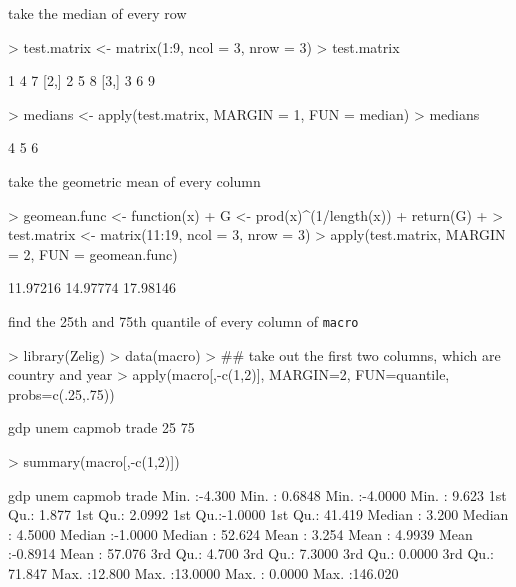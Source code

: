 \documentclass[handout]{beamer}
\newcommand{\red}{\color{red}}
\begin{document}
\begin{frame}[fragile]
take the median of every row
\bigskip
\red
\footnotesize
\begin{Schunk}
\begin{Sinput}
> test.matrix <- matrix(1:9, ncol = 3, nrow = 3)
> test.matrix
\end{Sinput}
\begin{Soutput}
     [,1] [,2] [,3]
[1,]    1    4    7
[2,]    2    5    8
[3,]    3    6    9
\end{Soutput}
\begin{Sinput}
> medians <- apply(test.matrix, MARGIN = 1, FUN = median)
> medians
\end{Sinput}
\begin{Soutput}
[1] 4 5 6
\end{Soutput}
\end{Schunk}
\end{frame}

\begin{frame}[fragile]
take the geometric mean of every column
\bigskip
\red
\footnotesize
\begin{Schunk}
\begin{Sinput}
> geomean.func <- function(x) {
+     G <- prod(x)^(1/length(x))
+     return(G)
+ }
> test.matrix <- matrix(11:19, ncol = 3, nrow = 3)
> apply(test.matrix, MARGIN = 2, FUN = geomean.func)
\end{Sinput}
\begin{Soutput}
[1] 11.97216 14.97774 17.98146
\end{Soutput}
\end{Schunk}
\end{frame}

\begin{frame}[fragile]
find the 25th and 75th quantile of every column of {\tt macro}
\bigskip
\red
\footnotesize
\begin{Schunk}
\begin{Sinput}
> library(Zelig)
> data(macro)
> ## take out the first two columns, which are country and year
> apply(macro[,-c(1,2)], MARGIN=2, FUN=quantile, probs=c(.25,.75))
\end{Sinput}
\begin{Soutput}
         gdp     unem capmob    trade
25%
75%
\end{Soutput}
\begin{Sinput}
> summary(macro[,-c(1,2)])
\end{Sinput}
\begin{Soutput}
      gdp              unem             capmob            trade        
 Min.   :-4.300   Min.   : 0.6848   Min.   :-4.0000   Min.   :  9.623  
 1st Qu.: 1.877   1st Qu.: 2.0992   1st Qu.:-1.0000   1st Qu.: 41.419  
 Median : 3.200   Median : 4.5000   Median :-1.0000   Median : 52.624  
 Mean   : 3.254   Mean   : 4.9939   Mean   :-0.8914   Mean   : 57.076  
 3rd Qu.: 4.700   3rd Qu.: 7.3000   3rd Qu.: 0.0000   3rd Qu.: 71.847  
 Max.   :12.800   Max.   :13.0000   Max.   : 0.0000   Max.   :146.020  
\end{Soutput}
\end{Schunk}
\end{frame}
\end{document}
